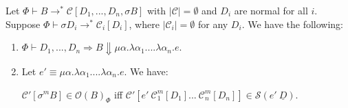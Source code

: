 \documentclass{llncs}
\begin{document}
\begin{theorem}
Let $\Phi \vdash B \to^* \mathcal{C}[D_1, ..., D_n, \sigma B]$
with $|\mathcal{C}| = \emptyset$ and $D_i$ are normal for all $i$. Suppose $\Phi \vdash \sigma D_i \to^* \mathcal{C}_i[D_i]$, where $| \mathcal{C}_i | = \emptyset$ for any $D_i$. We have the following: 

\begin{enumerate}
\item $\Phi \vdash D_1, ..., D_n \Rightarrow B \Downarrow \mu \alpha . \lambda \alpha_1 .... \lambda \alpha_n . e$.
\item Let $e' \equiv \mu \alpha . \lambda \alpha_1 .... \lambda \alpha_n . e$. We have: 

$\mathcal{C}'[\sigma^m B] \in \mathcal{O}(B)_{\Phi}$ iff $\mathcal{C}'[e' \ \mathcal{C}_1^m[D_1] ...\ \mathcal{C}_n^m[D_n]] \in \mathcal{S}(e' \ \underline{D})$. 
\end{enumerate}
\end{theorem}
\end{document}
